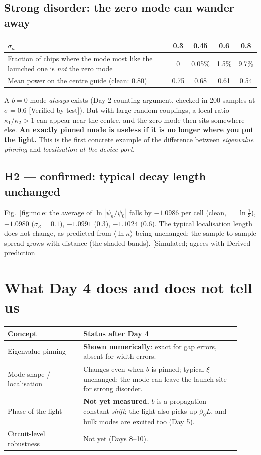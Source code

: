 \documentclass[10pt,a4paper]{article}
\newcommand{\evd}[1]{\textsf{\small[#1]}}
\begin{document}
\subsection{Strong disorder: the zero mode can wander away}
\begin{tabular}{@{}lcccc@{}}\toprule
$\sigma_\kappa$ & 0.3 & 0.45 & 0.6 & 0.8\\\midrule
Fraction of chips where the mode most like the launched one is \emph{not} the zero mode & 0 & 0.05\% & 1.5\% & 9.7\%\\
Mean power on the centre guide (clean: 0.80) & 0.75 & 0.68 & 0.61 & 0.54\\\bottomrule
\end{tabular}
\smallskip

A $b=0$ mode \emph{always} exists (Day-2 counting argument, checked in 200 samples at $\sigma=0.6$ \evd{Verified-by-test}). But with large random couplings, a local ratio $\kappa_1/\kappa_2>1$ can appear near the centre, and the zero mode then sits somewhere else. \textbf{An exactly pinned mode is useless if it is no longer where you put the light.} This is the first concrete example of the difference between \emph{eigenvalue pinning} and \emph{localisation at the device port}.

\subsection{H2 --- confirmed: typical decay length unchanged}
Fig.~\ref{fig:mc}e: the average of $\ln|\psi_n/\psi_0|$ falls by $-1.0986$ per cell (clean, $=\ln\tfrac13$), $-1.0980$ ($\sigma_\kappa=0.1$), $-1.0991$ (0.3), $-1.1024$ (0.6). The typical localisation length does not change, as predicted from $\langle\ln\kappa\rangle$ being unchanged; the sample-to-sample spread grows with distance (the shaded bands). \evd{Simulated; agrees with Derived prediction}

\section{What Day 4 does and does not tell us}
\begin{tabular}{@{}p{0.3\linewidth}p{0.62\linewidth}@{}}\toprule
Concept & Status after Day 4\\\midrule
Eigenvalue pinning & \textbf{Shown numerically}: exact for gap errors, absent for width errors.\\
Mode shape / localisation & Changes even when $b$ is pinned; typical $\xi$ unchanged; the mode can leave the launch site for strong disorder.\\
Phase of the light & \textbf{Not yet measured.} $b$ is a propagation-constant \emph{shift}; the light also picks up $\beta_0L$, and bulk modes are excited too (Day 5).\\
Circuit-level robustness & Not yet (Days 8--10).\\\bottomrule
\end{tabular}
\end{document}

